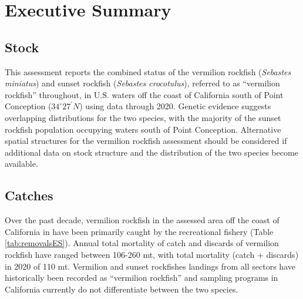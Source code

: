 \documentclass[11pt,
  english,
  a4paper,
]{article}
\begin{document}
\hypertarget{executive-summary}{%
\section*{Executive Summary}\label{executive-summary}}

\leavevmode\tagmcend\tagstructend


\hypertarget{stock}{%
\subsection*{Stock}\label{stock}}

\leavevmode\tagmcend\tagstructend

This assessment reports the combined status of the vermilion rockfish (\emph{Sebastes miniatus}) and sunset rockfish (\emph{Sebastes crocotulus}), referred to as ``vermilion rockfish'' throughout, in U.S. waters off the coast of California south of Point Conception ($34^\circ 27^\prime N$) using data through 2020. Genetic evidence suggests overlapping distributions for the two species, with the majority of the sunset rockfish population occupying waters south of Point Conception. Alternative spatial structures for the vermilion rockfish assessment should be considered if additional data on stock structure and the distribution of the two species become available.


\hypertarget{catches}{%
\subsection*{Catches}\label{catches}}

\leavevmode\tagmcend\tagstructend

Over the past decade, vermilion rockfish in the assessed area off the coast of California in have been primarily caught by the recreational fishery (Table \ref{tab:removalsES}). Annual total mortality of catch and discards of vermilion rockfish have ranged between 106-260 mt, with total mortality (catch + discards) in 2020 of 110 mt. Vermilion and sunset rockfishes landings from all sectors have historically been recorded as ``vermilion rockfish'' and sampling programs in California currently do not differentiate between the two species.
\end{document}
